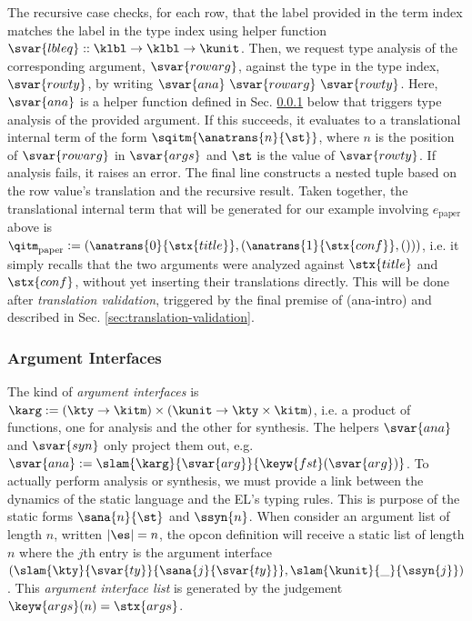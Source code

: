 The recursive case checks, for each row, that the label provided in the term index matches the label in the type index using helper function $\svar{lbleq} :: \klbl \rightarrow \klbl \rightarrow \kunit$. Then, we request type analysis of the corresponding argument, $\svar{rowarg}$, against the type in the type index, $\svar{rowty}$, by writing $\svar{ana}~\svar{rowarg}~\svar{rowty}$. Here, $\svar{ana}$ is a helper function defined in Sec. \ref{sec:argument-interfaces} below that triggers type analysis of the provided argument. If this succeeds, it evaluates to a translational internal term  of the form $\sqitm{\anatrans{n}{\st}}$, where $n$ is the position of $\svar{rowarg}$ in $\svar{args}$ and $\st$ is the value of $\svar{rowty}$. If analysis fails, it raises an error. The final line constructs a nested tuple based on the row value's translation and the recursive result. Taken together, the translational internal term that will be generated for our example involving $e_\text{paper}$ above is $\small\qitm_\text{paper} := (\anatrans{0}{\stx{title}}, (\anatrans{1}{\stx{conf}}, ()))$, i.e. it simply recalls that the two arguments were analyzed against $\stx{title}$ and  $\stx{conf}$, without yet inserting their translations directly. 
This will be done after \emph{translation validation}, triggered by the final premise of (ana-intro) and described in Sec. \ref{sec:translation-validation}. %

\subsubsection{Argument Interfaces} \label{sec:argument-interfaces}
\noindent
The kind of \emph{argument interfaces} is $\karg := (\kty \rightarrow \kitm) \times (\kunit \rightarrow \kty\times\kitm)$, i.e. a  product of functions, one for analysis and the other for synthesis. The helpers $\svar{ana}$ and $\svar{syn}$ only project them out, e.g. $\svar{ana} := \slam{\karg}{\svar{arg}}{\keyw{fst}(\svar{arg})}$. To actually perform analysis or synthesis, we must provide a link between the dynamics of the static language and the EL's typing rules. This is purpose of the static forms $\sana{n}{\st}$ and $\ssyn{n}$. When consider an argument list of length $n$, written $|\es|=n$, the opcon definition will receive a static list of length $n$ where the $j$th entry is the argument interface $(\slam{\kty}{\svar{ty}}{\sana{j}{\svar{ty}}}, \slam{\kunit}{\_}{\ssyn{j}})$. This \emph{argument interface list} is generated by the judgement $\keyw{args}(n)=\stx{args}$.

